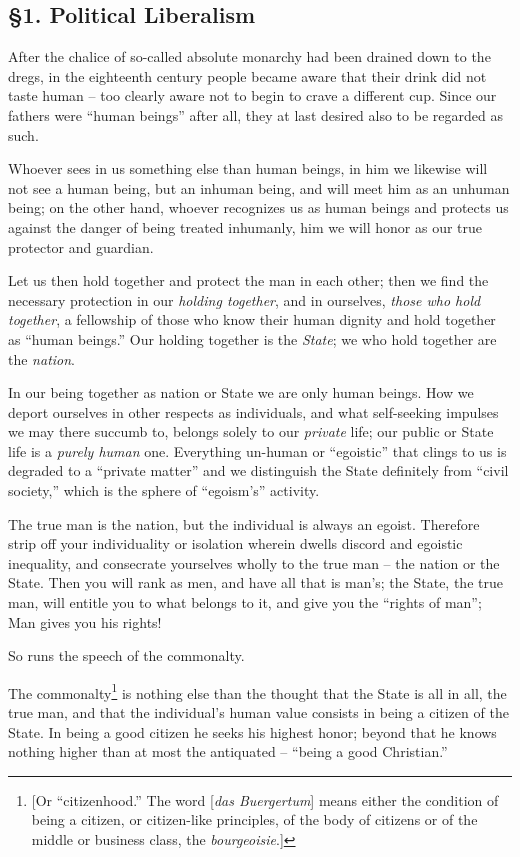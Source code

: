 \documentclass[12pt,a4paper]{book}
\begin{document}
\subsection[\S{}1. Political Liberalism]{\centering \S{}1. Political Liberalism}

After the chalice of so-called absolute monarchy had been drained down to the 
dregs, in the eighteenth century people became aware that their drink did not 
taste human -- too clearly aware not to begin to crave a different cup. Since 
our fathers were ``human beings'' after all, they at last desired also to be 
regarded as such.

Whoever sees in us something else than human beings, in him we likewise will 
not see a human being, but an inhuman being, and will meet him as an unhuman 
being; on the other hand, whoever recognizes us as human beings and protects 
us against the danger of being treated inhumanly, him we will honor as our 
true protector and guardian.

Let us then hold together and protect the man in each other; then we find the 
necessary protection in our \textit{holding together}, and in ourselves, 
\textit{those who hold together}, a fellowship of those who know their human 
dignity and hold together as ``human beings.'' Our holding together is the 
\textit{State}; we who hold together are the \textit{nation}.

In our being together as nation or State we are only human beings. How we 
deport ourselves in other respects as individuals, and what self-seeking 
impulses we may there succumb to, belongs solely to our \textit{private} life; 
our public or State life is a \textit{purely human} one. Everything un-human 
or ``egoistic'' that clings to us is degraded to a ``private matter'' and 
we distinguish the State definitely from ``civil society,'' which is the 
sphere of ``egoism's'' activity.

The true man is the nation, but the individual is always an egoist. Therefore 
strip off your individuality or isolation wherein dwells discord and egoistic 
inequality, and consecrate yourselves wholly to the true man -- the nation or 
the State. Then you will rank as men, and have all that is man's; the State, 
the true man, will entitle you to what belongs to it, and give you the 
``rights of man''; Man gives you his rights!

So runs the speech of the commonalty.

The commonalty\footnote{[Or ``citizenhood.'' The word [\textit{das 
Buergertum}] means either the condition of being a citizen, or citizen-like 
principles, of the body of citizens or of the middle or business class, the 
\textit{bourgeoisie}.]} is nothing else than the thought that the State is all 
in all, the true man, and that the individual's human value consists in being 
a citizen of the State. In being a good citizen he seeks his highest honor; 
beyond that he knows nothing higher than at most the antiquated -- ``being a 
good Christian.''
\end{document}
